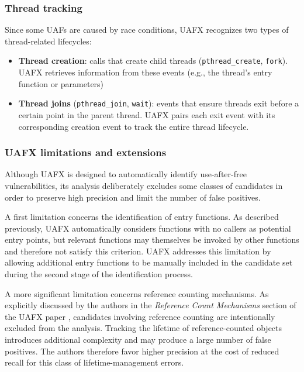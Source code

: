 \subsubsection{Thread tracking}
Since some UAFs are caused by race conditions, UAFX recognizes two types of thread-related lifecycles:
\begin{itemize}
    \item \textbf{Thread creation}: calls that create child threads (\texttt{pthread\_create}, \texttt{fork}). UAFX retrieves information from these events (e.g., the thread's entry function or parameters)

    \item \textbf{Thread joins} (\texttt{pthread\_join}, \texttt{wait}): events that ensure threads exit before a certain point in the parent thread. UAFX pairs each exit event with its corresponding creation event to track the entire thread lifecycle.
\end{itemize}

\subsubsection{UAFX limitations and extensions}

Although UAFX is designed to automatically identify use-after-free vulnerabilities, its analysis deliberately excludes some classes of candidates in order to preserve high precision and limit the number of false positives.

A first limitation concerns the identification of entry functions. As described previously, UAFX automatically considers functions with no callers as potential entry points, but relevant functions may themselves be invoked by other functions and therefore not satisfy this criterion. UAFX addresses this limitation by allowing additional entry functions to be manually included in the candidate set during the second stage of the identification process.

A more significant limitation concerns reference counting mechanisms. As explicitly discussed by the authors in the \textit{Reference Count Mechanisms} section of the UAFX paper \cite{bib:uafx}, candidates involving reference counting are intentionally excluded from the analysis. Tracking the lifetime of reference-counted objects introduces additional complexity and may produce a large number of false positives. The authors therefore favor higher precision at the cost of reduced recall for this class of lifetime-management errors.

